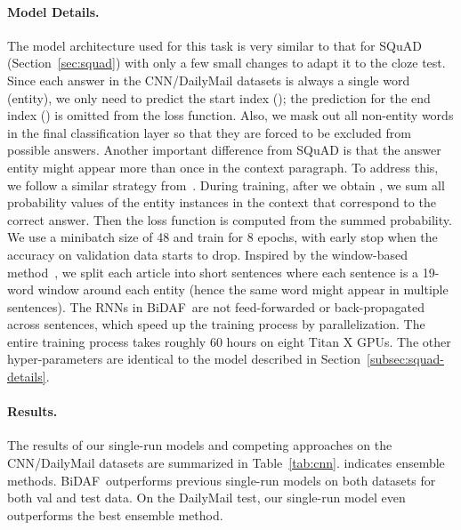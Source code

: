 \documentclass{article} \usepackage{iclr2017_conference,times}
\newcommand{\sysshort}{\mbox{\sc BiDAF}}
\begin{document}
\paragraph{Model Details.}\label{subsec:cnn-details}
The model architecture used for this task is very similar to that for SQuAD (Section~\ref{sec:squad}) with only a few small changes to adapt it to the cloze test. 
Since each answer in the CNN/DailyMail datasets is always a single word (entity), we only need to predict the start index (); the prediction for the end index () is omitted from the loss function. 
Also, we mask out all non-entity words in the final classification layer so that they are forced to be excluded from possible answers. Another important difference from SQuAD is that the answer entity might appear more than once in the context paragraph. To address this, we follow a similar strategy from~\cite{kadlec2016text}. 
During training, after we obtain , we sum all probability values of the entity instances in the context that correspond to the correct answer. 
Then the loss function is computed from the summed probability.
We use a minibatch size of 48 and train for 8 epochs, with early stop when the accuracy on validation data starts to drop. 
Inspired by the window-based method~\citep{hill2015goldilocks}, 
we split each article into short sentences where each sentence is a 19-word window around each entity (hence the same word might appear in multiple sentences).
The RNNs in \sysshort\ are not feed-forwarded or back-propagated across sentences, which speed up the training process by parallelization.
The entire training process takes roughly 60 hours on eight Titan X GPUs. The other hyper-parameters are identical to the model described in Section~\ref{subsec:squad-details}.


\paragraph{Results.}




The results of our single-run models and competing approaches on the CNN/DailyMail datasets are summarized in Table~\ref{tab:cnn}. 
 indicates ensemble methods. 
\sysshort\ outperforms previous single-run models on both datasets for both val and test data. On the DailyMail test, our single-run model even outperforms the best ensemble method.
\end{document}
